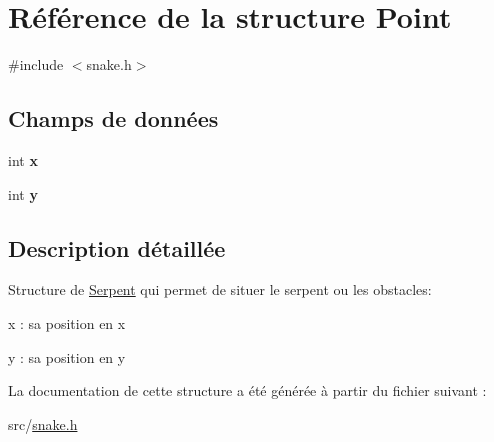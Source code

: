 \hypertarget{struct_point}{\section{Référence de la structure Point}
\label{struct_point}
}


{\ttfamily \#include $<$snake.\-h$>$}

\subsection*{Champs de données}
\begin{DoxyCompactItemize}
\item 
\hypertarget{struct_point_a6150e0515f7202e2fb518f7206ed97dc}{int {\bfseries x}}\label{struct_point_a6150e0515f7202e2fb518f7206ed97dc}

\item 
\hypertarget{struct_point_a0a2f84ed7838f07779ae24c5a9086d33}{int {\bfseries y}}\label{struct_point_a0a2f84ed7838f07779ae24c5a9086d33}

\end{DoxyCompactItemize}


\subsection{Description détaillée}
Structure de \hyperlink{struct_serpent}{Serpent} qui permet de situer le serpent ou les obstacles\-:
\begin{DoxyItemize}
\item x \-: sa position en x
\item y \-: sa position en y 
\end{DoxyItemize}

La documentation de cette structure a été générée à partir du fichier suivant \-:\begin{DoxyCompactItemize}
\item 
src/\hyperlink{snake_8h}{snake.\-h}\end{DoxyCompactItemize}
